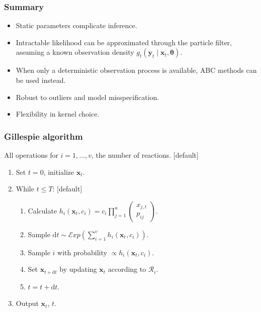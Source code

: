 \documentclass{beamer}
\newcommand{\bx}{\bm{x}}
\newcommand{\by}{\bm{y}}
\newcommand{\btheta}{\bm{\theta}}
\newcommand{\obs}{g}
\newcommand{\dx}[1]{\mathrm{d}{#1}}
\begin{document}
    \begin{frame}
    \frametitle{Summary}
    \begin{itemize}
        \item Static parameters complicate inference.
        \item Intractable likelihood can be approximated through the particle filter, assuming a known observation density $\obs_t(\by_t \mid \bx_t, \btheta)$.
        \item When only a deterministic observation process is available, ABC methods can be used instead.
        \item Robust to outliers and model misspecification.
        \item Flexibility in kernel choice.
    \end{itemize}
    \end{frame}

    \begin{frame}[noframenumbering]
    \frametitle{Gillespie algorithm}
    All operations for $i = 1, \ldots, v$, the number of reactions.
    [default]
    \begin{enumerate}
        \item Set  $t = 0$, initialize $\bx_t$.
        \item While $t \leq T$:
        [default]
        \begin{enumerate}
            \item Calculate $\displaystyle h_i(\bx_t, c_i) = c_i \prod_{j=1}^u \begin{pmatrix}
            x_{j,t} \\
            p_{ij}
            \end{pmatrix}$.
            \item Sample $\dx{t} \sim \mathcal{E}\mathit{xp}(\sum_{i=1}^v h_i(\bx_t, c_i))$.
            \item Sample $i$ with probability $\propto h_i(\bx_t, c_i)$.
            \item Set $\bx_{t+\dx{t}}$ by updating $\bx_t$ according to $\mathcal{R}_i$.
            \item $t = t + \dx{t}$.
        \end{enumerate}
        \item Output $\bx_t$, $t$.
    \end{enumerate}
    \end{frame}
\end{document}
